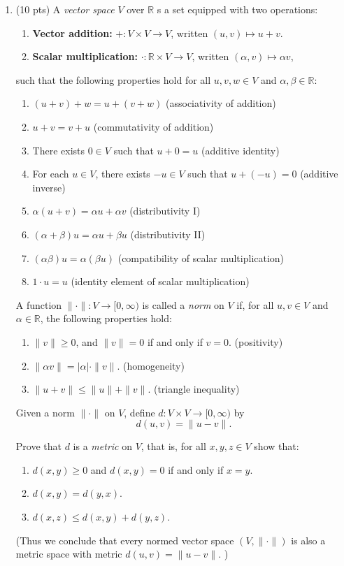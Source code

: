 \documentclass[12pt]{amsart}
\theoremstyle{definition}
\theoremstyle{remark}
\begin{document}
\begin{CJK}{UTF8}{bkai}
\begin{enumerate}
\item[(5)]  (10 pts)  A \emph{vector space} $V$ over $\mathbb{R}$ s a set 
equipped with two operations:
\begin{enumerate}
  \item \textbf{Vector addition:} $+: V \times V \to V$, written $(u,v) \mapsto u+v$.
  \item \textbf{Scalar multiplication:} $\cdot : \mathbb{R} \times V \to V$, written $(\alpha,v) \mapsto \alpha v$,
\end{enumerate}
such that the following properties hold for all $u,v,w \in V$ and $\alpha,\beta \in \mathbb{R}$:
\begin{enumerate}
  \item[(VS1)] $(u+v)+w = u+(v+w)$ \hfill (associativity of addition)
  \item[(VS2)] $u+v = v+u$ \hfill (commutativity of addition)
  \item[(VS3)] There exists $0 \in V$ such that $u+0=u$ \hfill (additive identity)
  \item[(VS4)] For each $u \in V$, there exists $-u \in V$ such that $u+(-u)=0$ \hfill (additive inverse)
  \item[(VS5)] $\alpha(u+v) = \alpha u + \alpha v$ \hfill (distributivity I)
  \item[(VS6)] $(\alpha+\beta)u = \alpha u + \beta u$ \hfill (distributivity II)
  \item[(VS7)] $(\alpha\beta)u = \alpha(\beta u)$ \hfill (compatibility of scalar multiplication)
  \item[(VS8)] $1 \cdot u = u$ \hfill (identity element of scalar multiplication)
\end{enumerate}

A function $\|\cdot\| : V \to [0,\infty)$ is called a \emph{norm} on $V$ if, 
for all $u,v \in V$ and $\alpha \in \mathbb{R}$, the following properties hold:
\begin{enumerate}
  \item[(N1)] $\|v\| \geq 0$, and $\|v\| = 0$ if and only if $v=0$. \hfill (positivity)
  \item[(N2)] $\|\alpha v\| = |\alpha| \cdot \|v\|$. \hfill (homogeneity)
  \item[(N3)] $\|u+v\| \leq \|u\| + \|v\|$. \hfill (triangle inequality)
\end{enumerate}

Given a norm $\|\cdot\|$ on $V$, define $d : V \times V \to [0,\infty)$ by
\[
d(u,v) = \|u-v\|.
\]


 Prove that $d$ is a \emph{metric} on $V$, that is, for all $x,y,z \in V$ show that:
  \begin{enumerate}
    \item $d(x,y) \geq 0$ and $d(x,y)=0$ if and only if $x=y$.
    \item $d(x,y) = d(y,x)$.
    \item $d(x,z) \leq d(x,y) + d(y,z)$.
  \end{enumerate}
(Thus we conclude that every normed vector space $(V,\|\cdot\|)$ is also a metric space with metric $d(u,v)=\|u-v\|$.
)


\end{enumerate}
\end{CJK}
\end{document}
